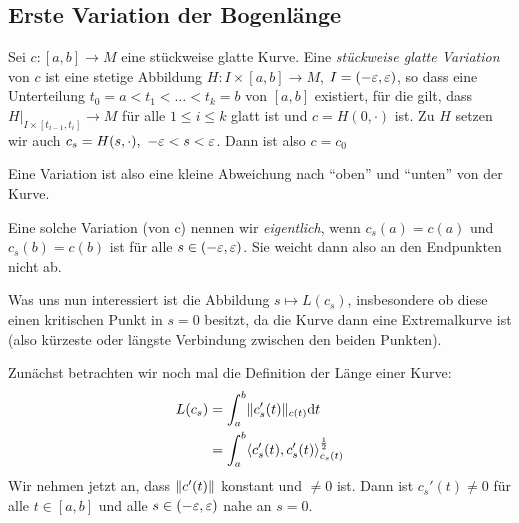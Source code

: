 \documentclass{skript}
\begin{document}
\subsection{Erste Variation der Bogenlänge}

Sei $c:[a,b]\to M$ eine stückweise glatte Kurve. Eine \emph{stückweise glatte
Variation} von $c$ ist eine stetige Abbildung $H:I\times [a,b]\to M$, $I =
(-\varepsilon,\varepsilon)$, so dass eine Unterteilung $t_0 = a < t_1 < \dots < t_k = b$ von
$[a,b]$ existiert, für die gilt, dass $H\vert_{I\times[t_{i-1},t_i]}\to M$ für
alle $1 \le i \le k$ glatt ist und $c = H(0,\cdot)$ ist. Zu $H$ setzen wir auch
$c_s = H(s,\cdot), \ -\eps<s<\eps$. Dann ist also $c = c_0$

Eine Variation ist also eine kleine Abweichung nach "`oben"' und "`unten"' von
der Kurve.



Eine solche Variation (von c) nennen wir \emph{eigentlich}, wenn $c_s(a) = c(a)$
und $c_s(b) = c(b)$ ist für alle $s\in(-\varepsilon,\varepsilon)$. Sie weicht dann also an den
Endpunkten nicht ab.

Was uns nun interessiert ist die Abbildung $s\mapsto L(c_s)$, insbesondere ob
diese einen kritischen Punkt in $s=0$ besitzt, da die Kurve dann eine
Extremalkurve ist (also kürzeste oder längste Verbindung zwischen den beiden
Punkten).

Zunächst betrachten wir noch mal die Definition der Länge einer Kurve:
\begin{align*}
  L(c_s) &= \int_a^b\norm[c(t)]{c_s'(t)}\d t \\
  &= \int_a^b\sprod[c_s(t)]{c_s'(t),c_s'(t)}^{\frac{1}{2}} 
\end{align*}
Wir nehmen jetzt an, dass $\norm{c'(t)}$ konstant und $\neq 0$ ist. Dann ist
$c_s'(t) \neq 0$ für alle $t\in[a,b]$ und alle $s\in(-\varepsilon,\varepsilon)$ nahe an $s=0$.
\end{document}
